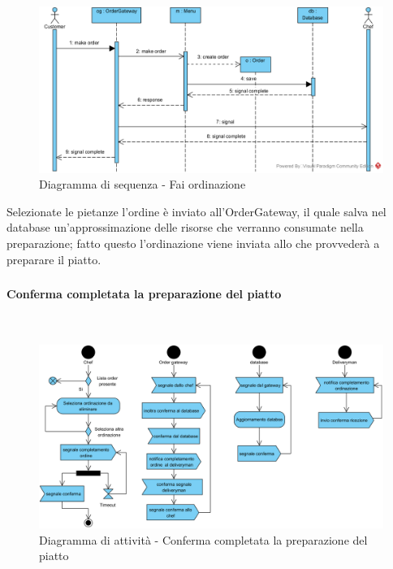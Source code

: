 \begin{figure}[H]
	\centering
	\includegraphics[width=14cm]{../../documenti/SpecificaTecnica/diagrammi_img/sequenza/cliente_fai_ordinazione.png}
	\caption{Diagramma di sequenza - Fai ordinazione}
\end{figure}
Selezionate le pietanze l'ordine è inviato all'Order\-Gateway, il quale salva nel database un'approssimazione delle risorse che verranno consumate nella preparazione; fatto questo l'ordinazione viene inviata allo \Chef{} che provvederà a preparare il piatto.

\subsubsection{\Chef{}}

\paragraph{Conferma completata la preparazione del piatto}\mbox{}\\
\nopagebreak
\begin{figure}[H]
	\centering
	\includegraphics[width=14cm]{diagrammi_img/attivita/chef_comlete_order.png}
\caption{Diagramma di attività - Conferma completata la preparazione del piatto}
\end{figure}

